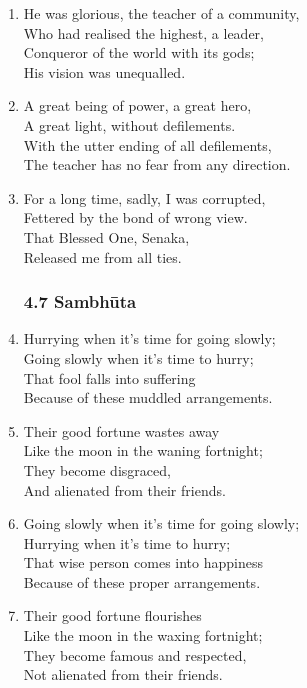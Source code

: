 \documentclass[10pt, openany]{book}
\begin{document}
\begin{enumerate}
\item He was glorious, the teacher of a community,\\
Who had realised the highest, a leader,\\
Conqueror of the world with its gods;\\
His vision was unequalled.

\item A great being of power, a great hero,\\
A great light, without defilements.\\
With the utter ending of all defilements,\\
The teacher has no fear from any direction.

\item For a long time, sadly, I was corrupted,\\
Fettered by the bond of wrong view.\\
That Blessed One, Senaka,\\
Released me from all ties.

\subsubsection*{4.7 Sambhūta}

\item Hurrying when it’s time for going slowly;\\
Going slowly when it’s time to hurry;\\
That fool falls into suffering\\
Because of these muddled arrangements.

\item Their good fortune wastes away\\
Like the moon in the waning fortnight;\\
They become disgraced,\\
And alienated from their friends.

\item Going slowly when it’s time for going slowly;\\
Hurrying when it’s time to hurry;\\
That wise person comes into happiness\\
Because of these proper arrangements.

\item Their good fortune flourishes\\
Like the moon in the waxing fortnight;\\
They become famous and respected,\\
Not alienated from their friends.


\end{enumerate}
\end{document}
